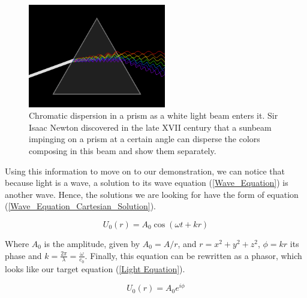 \begin{figure}[htbp]
    \centering
    \includegraphics[width=6cm]{images/c02/EM Waves/Prism.PNG}
    \caption{Chromatic dispersion in a prism as a white light beam enters it. Sir Isaac Newton discovered in the late XVII century that a sunbeam impinging on a prism at a certain angle can disperse the colors composing in this beam and show them separately.}
    \label{fig:Prism}
\end{figure}


Using this information to move on to our demonstration, we can notice that because light is a wave, a solution to its wave equation (\ref{Wave_Equation}) is another wave. Hence, the solutions we are looking for have the form of equation (\ref{Wave_Equation_Cartesian_Solution}).


\begin{equation}
    U_0(r) = A_0\cos(\omega t + kr)
    \label{Wave_Equation_Cartesian_Solution}
\end{equation}

Where $A_0$ is the amplitude, given by $A_0 = A/r$, and $r = x^2 + y^2 + z^2$, $\phi = kr$ its phase and $k = \frac{2\pi}{\lambda} = \frac{\omega}{c_0}$. Finally, this equation can be rewritten as a phasor, which looks like our target equation (\ref{Light Equation}).

\begin{equation}
    U_0(r) = A_0e^{i\phi}
\end{equation}

